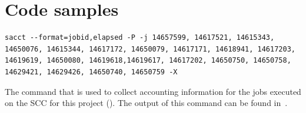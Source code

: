 \documentclass[12pt, a4paper, hidelinks]{article}
\begin{document}
\section{Code samples}

\begin{listing}[H]
\begin{verbatim}
sacct --format=jobid,elapsed -P -j 14657599, 14617521, 14615343, 14650076, 14615344, 14617172, 14650079, 14617171, 14618941, 14617203, 14619619, 14650080, 14619618,14619617, 14617202, 14650750, 14650758, 14629421, 14629426, 14650740, 14650759 -X
        \end{verbatim}
\caption[Sacct command]{The command that is used to collect accounting information for the jobs executed on the \ac{SCC} for this project (). The output of this command can be found in~.}
\label{lst:sacct_command}
\end{listing}
\end{document}
